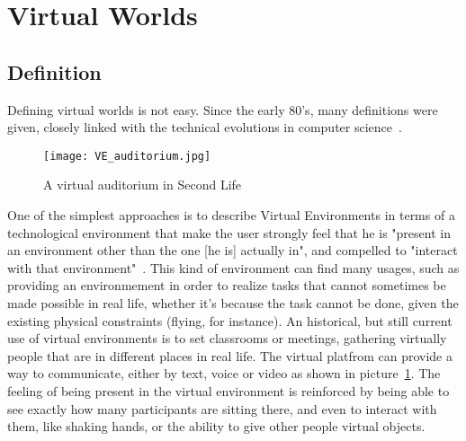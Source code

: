 \section{Virtual Worlds}
\label{sec:VE}

\subsection{Definition}
Defining virtual worlds is not easy. Since the early 80's, many definitions were given, closely linked with the technical evolutions in computer science~\cite{warburton2009second}. %

\begin{figure}[h]
  \caption{A virtual auditorium in Second Life ~\cite{ref_VE_audit}}
  \centering
  \texttt{[image: VE\_auditorium.jpg]}
  \label{fig:VE_audit}
\end{figure}


One of the simplest approaches is to describe Virtual Environments in terms of a technological environment that make the user strongly feel that he is "present in an environment other than the one [he is] actually in", and compelled to "interact with that environment"~\cite{schroeder1996possible}. This kind of environment can find many usages, such as providing an environmement in order to realize tasks that cannot sometimes be made possible in real life, whether it's because the task cannot be done, given the existing physical constraints (flying, for instance). An historical, but still current use of virtual environments is to set classrooms or meetings, gathering virtually people that are in different places in real life. The virtual platfrom can provide a way to communicate, either by text, voice or video as shown in picture~\ref{fig:VE_audit}. The feeling of being present in the virtual environment is reinforced by being able to see exactly how many participants are sitting there, and even to interact with them, like shaking hands, or the ability to give other people virtual objects.



